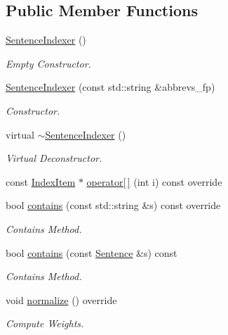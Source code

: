 \subsection*{Public Member Functions}
\begin{DoxyCompactItemize}
\item 
\hyperlink{class_sentence_indexer_a2ec9f359954191ebc5d84c759fd2238d}{Sentence\+Indexer} ()
\begin{DoxyCompactList}\small\item\em Empty Constructor. \end{DoxyCompactList}\item 
\hyperlink{class_sentence_indexer_a65a376d016bd9ff8a9f7c1f8521f2a1f}{Sentence\+Indexer} (const std\+::string \&abbrevs\+\_\+fp)
\begin{DoxyCompactList}\small\item\em Constructor. \end{DoxyCompactList}\item 
\mbox{\label{class_sentence_indexer_a8048abf41bf3513d04c611e90afddcc5}} 
virtual \hyperlink{class_sentence_indexer_a8048abf41bf3513d04c611e90afddcc5}{$\sim$\+Sentence\+Indexer} ()
\begin{DoxyCompactList}\small\item\em Virtual Deconstructor. \end{DoxyCompactList}\item 
const \hyperlink{class_index_item}{Index\+Item} $\ast$ \hyperlink{class_sentence_indexer_a4f8655135cb46ba4fee6a53418f15d03}{operator\mbox{[}$\,$\mbox{]}} (int i) const override
\item 
bool \hyperlink{class_sentence_indexer_af3299500d89ff36586472f81eb8efae8}{contains} (const std\+::string \&s) const override
\begin{DoxyCompactList}\small\item\em Contains Method. \end{DoxyCompactList}\item 
bool \hyperlink{class_sentence_indexer_aa4af4b0d8b859bd6ff4eed4889c8447c}{contains} (const \hyperlink{class_sentence}{Sentence} \&s) const
\begin{DoxyCompactList}\small\item\em Contains Method. \end{DoxyCompactList}\item 
void \hyperlink{class_sentence_indexer_ae038d36081439a5107821ac48a318d66}{normalize} () override
\begin{DoxyCompactList}\small\item\em Compute Weights. \end{DoxyCompactList}\item 

\end{DoxyCompactItemize}
